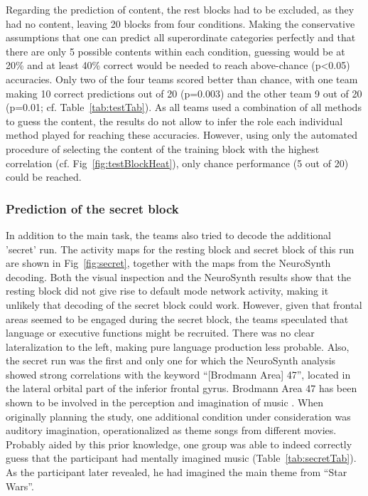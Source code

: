 \documentclass[fleqn,10pt]{SelfArx} %
\begin{document}
Regarding the prediction of content, the rest blocks had to be excluded, as they had no content, leaving 20 blocks from four conditions. Making the conservative assumptions that one can predict all superordinate categories perfectly and that there are only 5 possible contents within each condition, guessing would be at 20\% and at least 40\% correct would be needed to reach above-chance (p<0.05) accuracies. Only two of the four teams scored better than chance, with one team making 10 correct predictions out of 20 (p=0.003) and the other team 9 out of 20 (p=0.01; cf. Table~\ref{tab:testTab}). As all teams used a combination of all methods to guess the content, the results do not allow to infer the role each individual method played for reaching these accuracies. However, using only the automated procedure of selecting the content of the training block with the highest correlation (cf. Fig~\ref{fig:testBlockHeat}), only chance performance (5 out of 20) could be reached.

\subsubsection*{Prediction of the secret block}
In addition to the main task, the teams also tried to decode the additional 'secret' run. The activity maps for the resting block and secret block of this run are shown in Fig~\ref{fig:secret}, together with the maps from the NeuroSynth decoding.	
Both the visual inspection and the NeuroSynth results show that the resting block did not give rise to default mode network activity, making it unlikely that decoding of the secret block could work. However, given that frontal areas seemed to be engaged during the secret block, the teams speculated that language or executive functions might be recruited. There was no clear lateralization to the left, making pure language production less probable. Also, the secret run was the first and only one for which the NeuroSynth analysis showed strong correlations with the keyword “[Brodmann Area] 47”, located in the lateral orbital part of the inferior frontal gyrus. Brodmann Area 47 has been shown to be involved in the perception and imagination of music \citep{Koelsch_2005, Zatorre_2005}. When originally planning the study, one additional condition under consideration was auditory imagination, operationalized as theme songs from different movies. Probably aided by this prior knowledge, one group was able to indeed correctly guess that the participant had mentally imagined music (Table~\ref{tab:secretTab}). As the participant later revealed, he had imagined the main theme from “Star Wars”.
\end{document}
